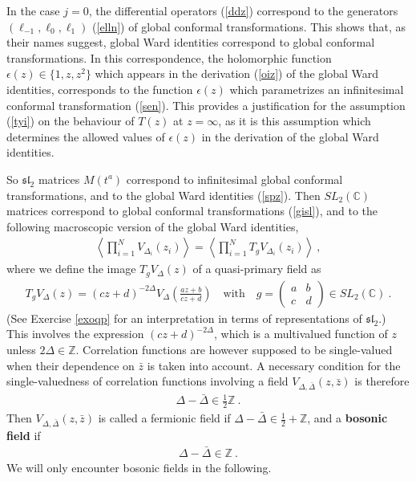 \documentclass[12pt,a4paper,notitlepage]{report}
\newcommand \la {\left\langle}
\newcommand \ra {\right\rangle}
\newcommand \Z {\mathbb{Z}}
\newcommand \C {\mathbb{C}}
\numberwithin{equation}{section}
\theoremstyle{break}
\begin{document}
In the case $j=0$, the differential operators (\ref{ddz}) correspond to the generators $(\ell_{-1},\ell_0,\ell_1)$ (\ref{elln}) of global conformal transformations. This shows that, as their names suggest, global Ward identities correspond to global conformal transformations. In this correspondence, the holomorphic function $\epsilon(z)\in\{1,z,z^2\}$ which appears in the derivation (\ref{oiz}) of the global Ward identities, corresponds to the function $\epsilon(z)$ which parametrizes an infinitesimal conformal transformation (\ref{sen}). 
This provides a justification for the assumption (\ref{tyi}) on the behaviour of $T(z)$ at $z=\infty$, as it is this assumption which determines the allowed values of $\epsilon(z)$ in the derivation of the global Ward identities. 

So $\mathfrak{sl}_2$ matrices $M(t^a)$ correspond to infinitesimal global conformal transformations, and to the global Ward identities (\ref{spz}). Then $SL_2(\C)$ matrices correspond to global conformal transformations (\ref{gisl}), and to the following macroscopic version of the global Ward identities,
\begin{align}
\la \prod_{i=1}^N V_{\Delta_i}(z_i)\ra  = \la \prod_{i=1}^N T_g V_{\Delta_i}(z_i) \ra \ , 
\label{vtv}
\end{align}
where we define the image $T_gV_\Delta(z)$ of a quasi-primary field as
\begin{align}
 \boxed{T_g V_\Delta(z) = (cz+d)^{-2\Delta} V_\Delta\left(\frac{az+b}{cz+d}\right)} \quad \text{with} \quad g = \left(\begin{array}{cc} a & b \\ c & d \end{array}\right) \in SL_2(\C)\ .
\label{tgv}
\end{align}
(See Exercise \ref{exoqp} for an interpretation in terms of representations of $\mathfrak{sl}_2$.)
This involves the expression $(cz+d)^{-2\Delta}$, which is a multivalued function of $z$ unless $2\Delta\in \Z$. Correlation functions  are however supposed to be single-valued when their dependence on $\bar{z}$ is taken into account. A necessary condition for the single-valuedness of correlation functions involving a field $V_{\Delta,\bar{\Delta}}(z,\bar{z})$ is therefore
\begin{align}
 \boxed{\Delta-\bar{\Delta} \in \frac12 \Z}\ .
\label{dbd}
\end{align}
Then $V_{\Delta,\bar{\Delta}}(z,\bar{z})$ is called a fermionic field if $\Delta-\bar{\Delta}\in \frac12 +\Z$, and a \textbf{bosonic field} if 
\begin{align}
 \Delta-\bar{\Delta} \in \Z\ .
\label{dbdz}
\end{align}
We will only encounter bosonic fields in the following.
\end{document}
